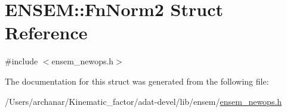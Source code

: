 \hypertarget{structENSEM_1_1FnNorm2}{}\section{E\+N\+S\+EM\+:\+:Fn\+Norm2 Struct Reference}
\label{structENSEM_1_1FnNorm2}


{\ttfamily \#include $<$ensem\+\_\+newops.\+h$>$}



The documentation for this struct was generated from the following file\+:\begin{DoxyCompactItemize}
\item 
/\+Users/archanar/\+Kinematic\+\_\+factor/adat-\/devel/lib/ensem/\mbox{\hyperlink{adat-devel_2lib_2ensem_2ensem__newops_8h}{ensem\+\_\+newops.\+h}}\end{DoxyCompactItemize}
